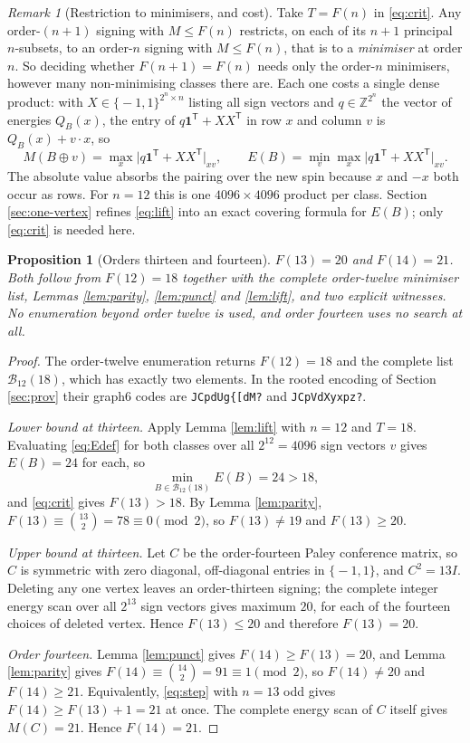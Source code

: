 \documentclass[11pt]{article}
\newcommand{\eps}{\{\!-1,1\!\}}
\newcommand{\T}{\mathsf T}
\newtheorem{proposition}[theorem]{Proposition}
\theoremstyle{remark}
\newtheorem{remark}[theorem]{Remark}
\begin{document}
\begin{remark}[Restriction to minimisers, and cost]\label{rem:restrict}
Take $T=F(n)$ in \eqref{eq:crit}.  Any order-$(n+1)$ signing with $M\le F(n)$
restricts, on each of its $n+1$ principal $n$-subsets, to an order-$n$ signing
with $M\le F(n)$, that is to a \emph{minimiser} at order $n$.  So deciding
whether $F(n+1)=F(n)$ needs only the order-$n$ minimisers, however many
non-minimising classes there are.  Each one costs a single dense product: with
$X\in\eps^{2^n\times n}$ listing all sign vectors and $q\in\mathbb Z^{2^n}$ the
vector of energies $Q_B(x)$, the entry of $q\mathbf1^{\T}+XX^{\T}$ in row $x$
and column $v$ is $Q_B(x)+v\cdot x$, so
\[
 M(B\oplus v)=\max_{x}\bigl|q\mathbf1^{\T}+XX^{\T}\bigr|_{xv},
 \qquad
 E(B)=\min_{v}\max_{x}\bigl|q\mathbf1^{\T}+XX^{\T}\bigr|_{xv}.
\]
The absolute value absorbs the pairing over the new spin because $x$ and $-x$
both occur as rows.  For $n=12$ this is one $4096\times4096$ product per class.
Section \ref{sec:one-vertex} refines \eqref{eq:lift} into an exact covering
formula for $E(B)$; only \eqref{eq:crit} is needed here.
\end{remark}

\begin{proposition}[Orders thirteen and fourteen]\label{prop:1314}
$F(13)=20$ and $F(14)=21$.  Both follow from $F(12)=18$ together with the
complete order-twelve minimiser list, Lemmas \ref{lem:parity},
\ref{lem:punct} and \ref{lem:lift}, and two explicit witnesses.  No
enumeration beyond order twelve is used, and order fourteen uses no search at
all.
\end{proposition}

\begin{proof}
The order-twelve enumeration returns $F(12)=18$ and the complete list
$\mathcal B_{12}(18)$, which has exactly two elements.  In the rooted encoding
of Section \ref{sec:prov} their graph6 codes are
\texttt{JCpdUg\{[dM?} and \texttt{JCpVdXyxpz?}.

\emph{Lower bound at thirteen.}  Apply Lemma \ref{lem:lift} with $n=12$ and
$T=18$.  Evaluating \eqref{eq:Edef} for both classes over all $2^{12}=4096$
sign vectors $v$ gives $E(B)=24$ for each, so
\[
 \min_{B\in\mathcal B_{12}(18)}E(B)=24>18 ,
\]
and \eqref{eq:crit} gives $F(13)>18$.  By Lemma \ref{lem:parity},
$F(13)\equiv\binom{13}2=78\equiv0\pmod2$, so $F(13)\ne19$ and
$F(13)\ge20$.

\emph{Upper bound at thirteen.}  Let $C$ be the order-fourteen Paley
conference matrix, so $C$ is symmetric with zero diagonal, off-diagonal
entries in $\eps$, and $C^2=13I$.  Deleting any one vertex leaves an
order-thirteen signing; the complete integer energy scan over all $2^{13}$
sign vectors gives maximum $20$, for each of the fourteen choices of deleted
vertex.  Hence $F(13)\le20$ and therefore $F(13)=20$.

\emph{Order fourteen.}  Lemma \ref{lem:punct} gives $F(14)\ge F(13)=20$, and
Lemma \ref{lem:parity} gives $F(14)\equiv\binom{14}2=91\equiv1\pmod2$, so
$F(14)\ne20$ and $F(14)\ge21$.  Equivalently, \eqref{eq:step} with $n=13$ odd
gives $F(14)\ge F(13)+1=21$ at once.  The complete energy scan of $C$ itself
gives $M(C)=21$.  Hence $F(14)=21$.
\end{proof}
\end{document}
